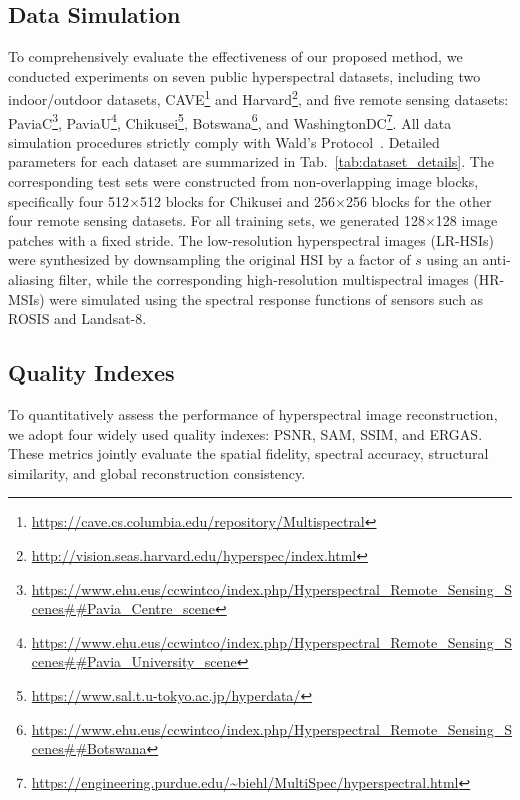 \subsection{Data Simulation}
To comprehensively evaluate the effectiveness of our proposed method, we conducted experiments on seven public hyperspectral datasets, including two indoor/outdoor datasets, CAVE\footnote{\url{https://cave.cs.columbia.edu/repository/Multispectral}} and Harvard\footnote{\url{http://vision.seas.harvard.edu/hyperspec/index.html}}, and five remote sensing datasets: PaviaC\footnote{\url{https://www.ehu.eus/ccwintco/index.php/Hyperspectral_Remote_Sensing_Scenes##Pavia_Centre_scene}}, PaviaU\footnote{\url{https://www.ehu.eus/ccwintco/index.php/Hyperspectral_Remote_Sensing_Scenes##Pavia_University_scene}}, Chikusei\footnote{\url{https://www.sal.t.u-tokyo.ac.jp/hyperdata/}}, Botswana\footnote{\url{https://www.ehu.eus/ccwintco/index.php/Hyperspectral_Remote_Sensing_Scenes##Botswana}}, and WashingtonDC\footnote{\url{https://engineering.purdue.edu/~biehl/MultiSpec/hyperspectral.html}}. All data simulation procedures strictly comply with Wald’s Protocol~\cite{wald2000quality}. Detailed parameters for each dataset are summarized in Tab.~\ref{tab:dataset_details}. The corresponding test sets were constructed from non-overlapping image blocks, specifically four 512$\times$512 blocks for Chikusei and 256$\times$256 blocks for the other four remote sensing datasets. For all training sets, we generated 128$\times$128 image patches with a fixed stride. The low-resolution hyperspectral images (LR-HSIs) were synthesized by downsampling the original HSI by a factor of $s$ using an anti-aliasing filter, while the corresponding high-resolution multispectral images (HR-MSIs) were simulated using the spectral response functions of sensors such as ROSIS and Landsat-8.

\subsection{Quality Indexes}
\label{QualityIndexes}

To quantitatively assess the performance of hyperspectral image reconstruction, we adopt four widely used quality indexes: PSNR, SAM, SSIM, and ERGAS. 
These metrics jointly evaluate the spatial fidelity, spectral accuracy, structural similarity, and global reconstruction consistency.

